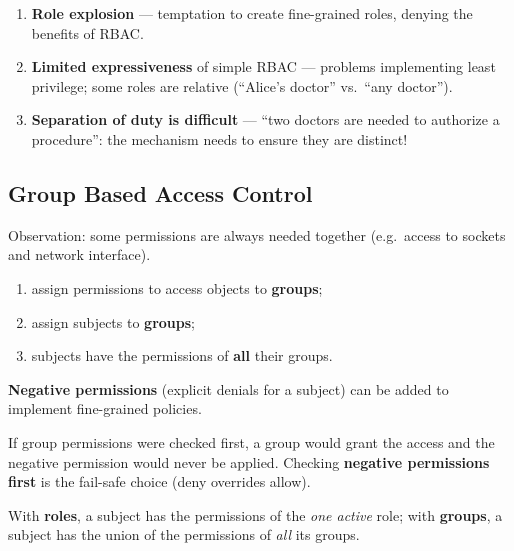 \begin{warnbox}[title=RBAC problems]
\begin{enumerate}
  \item \textbf{Role explosion} --- temptation to create fine-grained roles, denying the
        benefits of RBAC.
  \item \textbf{Limited expressiveness} of simple RBAC --- problems implementing least
        privilege; some roles are relative (``Alice's doctor'' vs.\ ``any doctor'').
  \item \textbf{Separation of duty is difficult} --- ``two doctors are needed to
        authorize a procedure'': the mechanism needs to ensure they are distinct!
\end{enumerate}
\end{warnbox}

\subsection{Group Based Access Control}

\begin{defnbox}[title=Group Based Access Control]
Observation: some permissions are always needed together (e.g.\ access to sockets and
network interface).
\begin{enumerate}
  \item assign permissions to access objects to \textbf{groups};
  \item assign subjects to \textbf{groups};
  \item subjects have the permissions of \textbf{all} their groups.
\end{enumerate}
\textbf{Negative permissions} (explicit denials for a subject) can be added to implement
fine-grained policies.
\end{defnbox}

\begin{propbox}[title=Negative permissions are checked first]
If group permissions were checked first, a group would grant the access and the
negative permission would never be applied. Checking \textbf{negative permissions first}
is the fail-safe choice (deny overrides allow).
\end{propbox}

\begin{rembox}[title=RBAC vs.\ groups]
With \textbf{roles}, a subject has the permissions of the \emph{one active} role; with
\textbf{groups}, a subject has the union of the permissions of \emph{all} its groups.
\end{rembox}

